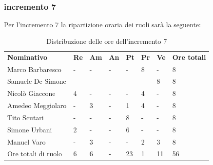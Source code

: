 \subsubsection{incremento 7}
Per l'incremento 7 la ripartizione oraria dei ruoli sarà la seguente:
\begin{center}
    \begin{table}[ht!]
        \centering
        \caption{Distribuzione delle ore dell'incremento 7}
        \vspace{5px}
        \renewcommand{\arraystretch}{1.8}
        \begin{tabular}{p{100px} p{20px} p{20px} p{20px} p{20px} p{20px} p{20px} p{50px} }
            \rowcolor{logo!70} \textbf{Nominativo} & \textbf{Re} & \textbf{Am} & \textbf{An} & \textbf{Pt} & \textbf{Pr} & \textbf{Ve} & \textbf{Ore totali} \\
            Marco Barbaresco                       & -           & -           & -           & -           & 8           & -           & 8                   \\
            Samuele De Simone                      & -           & -           & -           & -           & -           & 8           & 8                   \\
            Nicolò Giaccone                        & 4           & -           & -           & -           & 4           & -           & 8                   \\
            Amedeo Meggiolaro                      & -           & 3           & -           & 1           & 4           & -           & 8                   \\
            Tito Scutari                           & -           & -           & -           & 8           & -           & -           & 8                   \\
            Simone Urbani                          & 2           & -           & -           & 6           & -           & -           & 8                   \\
            Manuel Varo                            & -           & 3           & -           & -           & 2           & 3           & 8                   \\
            Ore totali di ruolo                    & 6           & 6           & -           & 23          & 1           & 11          & 56                  \\
        \end{tabular}
    \end{table}
\end{center}
